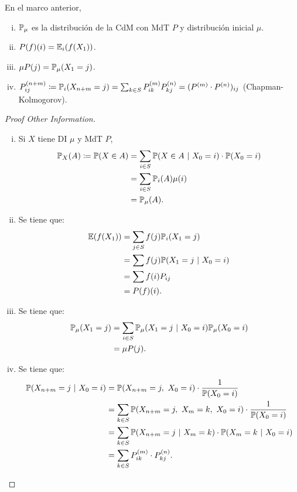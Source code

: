 
\begin{prop}
	En el marco anterior,
	\begin{enumerate}[i)]
		\item $\mathbb{P}_{\mu}$ es la distribución de la CdM con MdT $P$ y distribución inicial $\mu$.

		\item $P(f)(i) = \mathbb{E}_{i}(f(X_{1}))$.

		\item $\mu P(j) = \mathbb{P}_{\mu}(X_{1} = j)$.

		\item $P_{ij}^{(n+m)} \coloneq \mathbb{P}_{i}(X_{n+m} = j) = \sum_{k \in S} P_{ik}^{(m)} P_{kj}^{(n)} = (P^{(m)} \cdot P^{(n)})_{ij}$ (Chapman-Kolmogorov).
	\end{enumerate}
\end{prop}
\begin{proof}[Proof Other Information]
	\begin{enumerate}[i)]
		\item Si $X$ tiene DI $\mu$ y MdT $P$,
		\begin{align*}
			\mathbb{P}_{X}(A) \coloneq \mathbb{P}(X \in A) &= \sum_{i \in S} \mathbb{P}(X \in A \ | \ X_{0} = i) \cdot \mathbb{P}(X_{0} = i) \\
			&= \sum_{i \in S} \mathbb{P}_{i}(A) \mu(i) \\
			&= \mathbb{P}_{\mu}(A)
		.\end{align*}

		\item Se tiene que:
		\begin{align*}
			\mathbb{E}(f(X_{1})) &= \sum_{j \in S} f(j) \mathbb{P}_{i}(X_{1} = j) \\
			&= \sum f(j) \mathbb{P}(X_{1} = j \ | \ X_{0} = i) \\
			&= \sum f(i) P_{ij} \\
			&= P(f)(i)
		.\end{align*}

		\item Se tiene que:
		\begin{align*}
			\mathbb{P}_{\mu}(X_{1} = j) &= \sum_{i \in S} \mathbb{P}_{\mu}(X_{1} = j \ | \ X_{0} = i) \mathbb{P}_{\mu}(X_{0} = i) \\
			&= \mu P(j)
		.\end{align*}

		\item Se tiene que:
		\begin{align*}
			\mbb{P}(X_{n+m} = j \ | \ X_{0} = i) &= \mbb{P}(X_{n+m} = j,\ X_{0} = i) \cdot \frac{1}{\mbb{P}(X_{0} = i)} \\
			&= \sum_{k \in S} \mbb{P}(X_{n+m} = j,\ X_{m} = k,\ X_{0} = i) \cdot \frac{1}{\mbb{P}(X_{0} = i)} \\
			&= \sum_{k \in S} \mbb{P}(X_{n+m} = j \ | \ X_{m} = k) \cdot \mbb{P}(X_{m} = k \ | \ X_{0} = i) \\
			&= \sum_{k \in S} P_{ik}^{(m)} \cdot P_{kj}^{(n)}
		.\end{align*}
	\end{enumerate}
\end{proof}

